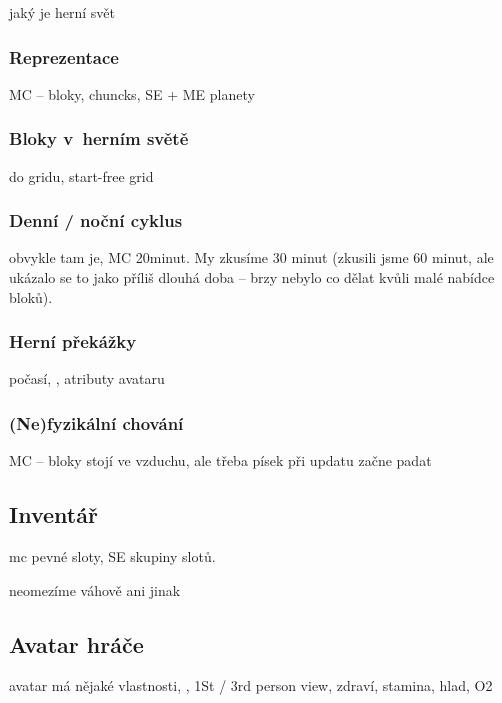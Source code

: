 jaký je herní svět

\subsubsection{Reprezentace}

MC -- bloky, chuncks, SE + ME planety

\subsubsection{Bloky v~herním světě}

do gridu, start-free grid


\subsubsection{Denní / noční cyklus}

obvykle tam je, MC 20minut. My zkusíme 30 minut (zkusili jsme 60 minut, ale ukázalo se to jako příliš dlouhá doba -- brzy nebylo co dělat kvůli malé nabídce bloků).

\subsubsection{Herní překážky}

počasí, \NPC{}, atributy avataru

\subsubsection{(Ne)fyzikální chování}

MC -- bloky stojí ve vzduchu, ale třeba písek při updatu začne padat

\subsection{Inventář}

mc pevné sloty, SE skupiny slotů.

neomezíme váhově ani jinak 

\subsection{Avatar hráče}
avatar má nějaké vlastnosti, \HUD{}, 1St / 3rd person view, zdraví, stamina, hlad, O2



